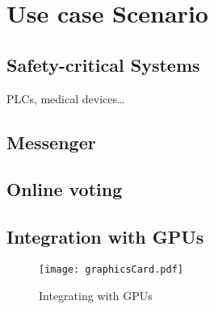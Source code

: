 \section{Use case Scenario}
\label{sec:usecase}

\subsection{Safety-critical Systems}
PLCs, medical devices\ldots

\subsection{Messenger}

\subsection{Online voting}

\subsection{Integration with GPUs}

\begin{figure}[h]
\centering
\texttt{[image: graphicsCard.pdf]}
\caption{Integrating \name with GPUs}
\label{fig:gpuIntegration}
\centering
\end{figure}